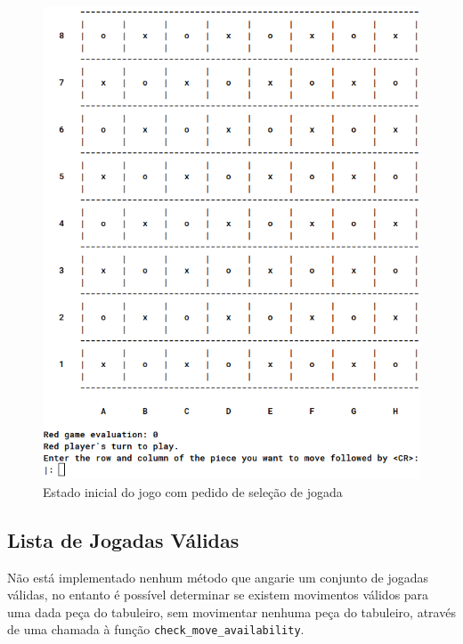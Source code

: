 \documentclass[a4paper]{article}
\begin{document}
\begin{figure}[H]
    \center
    \includegraphics[scale=0.5]{resources/piece-selection.png}
    \caption{Estado inicial do jogo com pedido de seleção de jogada}
    \label{fig:piece-selection.png}
\end{figure}

\subsection{Lista de Jogadas Válidas}
Não está implementado nenhum método que angarie um conjunto de jogadas válidas, no entanto é possível determinar se existem movimentos válidos para uma dada peça do tabuleiro, sem movimentar nenhuma peça do tabuleiro, através de uma chamada à função \texttt{check\_move\_availability}.
\end{document}
